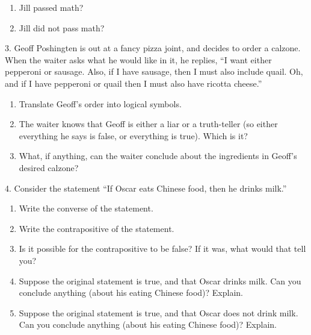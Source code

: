 \documentclass[10pt,]{book}
\theoremstyle{plain}
\theoremstyle{definition}
\theoremstyle{definition}
\theoremstyle{definition}
\theoremstyle{definition}
\numberwithin{equation}{chapter}
\begin{document}
\begin{exerciselist}
\begin{enumerate}[label=(\alph*)]
\begin{enumerate}[label=\roman*.]
\item\hypertarget{li-536}{}Jill passed math?%
\item\hypertarget{li-537}{}Jill did not pass math?%
\end{enumerate}
%
\end{enumerate}
\par\smallskip
\item[3.]\hypertarget{exercise-127}{}\hypertarget{p-1108}{}%
Geoff Poshingten is out at a fancy pizza joint, and decides to order a calzone. When the waiter asks what he would like in it, he replies, ``I want either pepperoni or sausage. Also, if I have sausage, then I must also include quail. Oh, and if I have pepperoni or quail then I must also have ricotta cheese.''%
\leavevmode%
\begin{enumerate}[label=(\alph*)]
\item\hypertarget{li-545}{}\hypertarget{p-1109}{}%
Translate Geoff's order into logical symbols.%
\item\hypertarget{li-546}{}\hypertarget{p-1110}{}%
The waiter knows that Geoff is either a liar or a truth-teller (so either everything he says is false, or everything is true).  Which is it?%
\item\hypertarget{li-547}{}\hypertarget{p-1111}{}%
What, if anything, can the waiter conclude about the ingredients in Geoff's desired calzone?%
\end{enumerate}
\par\smallskip
\item[4.]\hypertarget{exercise-128}{}\hypertarget{p-1112}{}%
Consider the statement ``If Oscar eats Chinese food, then he drinks milk.''%
\leavevmode%
\begin{enumerate}[label=(\alph*)]
\item\hypertarget{li-548}{}\hypertarget{p-1113}{}%
Write the converse of the statement.%
\item\hypertarget{li-549}{}\hypertarget{p-1114}{}%
Write the contrapositive of the statement.%
\item\hypertarget{li-550}{}\hypertarget{p-1115}{}%
Is it possible for the contrapositive to be false? If it was, what would that tell you?%
\item\hypertarget{li-551}{}\hypertarget{p-1116}{}%
Suppose the original statement is true, and that Oscar drinks milk. Can you conclude anything (about his eating Chinese food)? Explain.%
\item\hypertarget{li-552}{}\hypertarget{p-1117}{}%
Suppose the original statement is true, and that Oscar does not drink milk. Can you conclude anything (about his eating Chinese food)? Explain.%

\end{enumerate}
\end{exerciselist}
\end{document}
